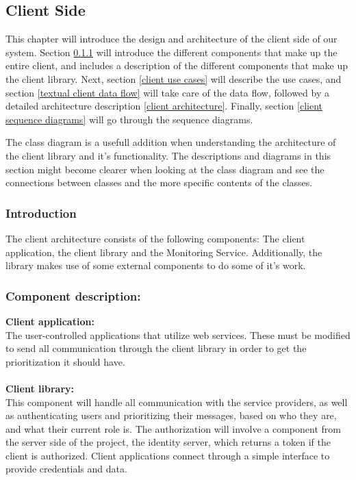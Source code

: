 \subsection{Client Side}\label{client side}

This chapter will introduce the design and architecture of the client side of our system. Section \ref{client introduction} will introduce the different components that make up the entire client, and includes a description of the different components that make up the client library. Next, section \ref{client use cases} will describe the use cases, and section \ref{textual client data flow} will take care of the data flow, followed by a detailed architecture description \ref{client architecture}. Finally, section \ref{client sequence diagrams} will go through the sequence diagrams.
    
    The class diagram is a usefull addition when understanding the architecture of the client library and it's functionality. The descriptions and diagrams in this section might become clearer when looking at the class diagram and see the connections between classes and the more specific contents of the classes. 
		
    \subsubsection{Introduction}\label{client introduction}
The client architecture consists of the following components: The client application, the client library and the Monitoring Service. Additionally, the library makes use of some external components to do some of it's work.

    \subsubsection{Component description:}\label{Component description}

\indent \indent \textbf{Client application:}\\
	The user-controlled applications that utilize web services. These must be modified to send all communication through the client library in order to get the prioritization it should have.
\\\\

\indent \textbf{Client library:}\\
This component will handle all communication with the service providers, as well as authenticating users and prioritizing their messages, based on who they are, and what their current role is. The authorization will involve a component from the server side of the project, the identity server, which returns a token if the client is authorized. Client applications connect through a simple interface to provide credentials and data.
\\\\ 


